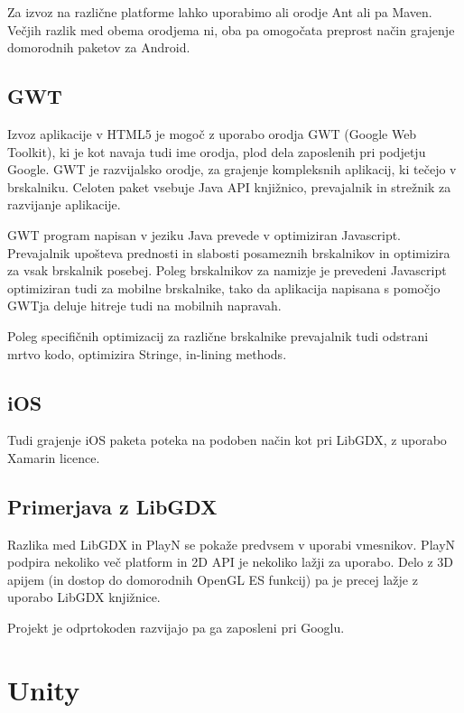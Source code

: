 Za izvoz na različne platforme lahko uporabimo ali orodje Ant ali pa Maven. Večjih razlik med obema orodjema ni, oba pa omogočata preprost način grajenje domorodnih paketov za Android.

\subsection{GWT}

Izvoz aplikacije v HTML5 je mogoč z uporabo orodja GWT (Google Web Toolkit), ki je kot navaja tudi ime orodja, plod dela zaposlenih pri podjetju Google. GWT je razvijalsko orodje, za grajenje kompleksnih aplikacij, ki tečejo v brskalniku. Celoten paket vsebuje Java API knjižnico, prevajalnik in strežnik za razvijanje aplikacije.

GWT program napisan v jeziku Java prevede v optimiziran Javascript. Prevajalnik upošteva prednosti in slabosti posameznih brskalnikov in optimizira za vsak brskalnik posebej. Poleg brskalnikov za namizje je prevedeni Javascript optimiziran tudi za mobilne brskalnike, tako da aplikacija napisana s pomočjo GWTja deluje hitreje tudi na mobilnih napravah.

Poleg specifičnih optimizacij za različne brskalnike prevajalnik tudi odstrani mrtvo kodo, optimizira Stringe, in-lining methods.



\subsection{iOS}

Tudi grajenje iOS paketa poteka na podoben način kot pri LibGDX, z uporabo Xamarin licence.

\subsection{Primerjava z LibGDX}

Razlika med LibGDX in PlayN se pokaže predvsem v uporabi vmesnikov. PlayN podpira nekoliko več platform in 2D API je nekoliko lažji za uporabo. Delo z 3D apijem (in dostop do domorodnih OpenGL ES funkcij) pa je precej lažje z uporabo LibGDX knjižnice. 

Projekt je odprtokoden razvijajo pa ga zaposleni pri Googlu.

\section{Unity\cite{unity}}

